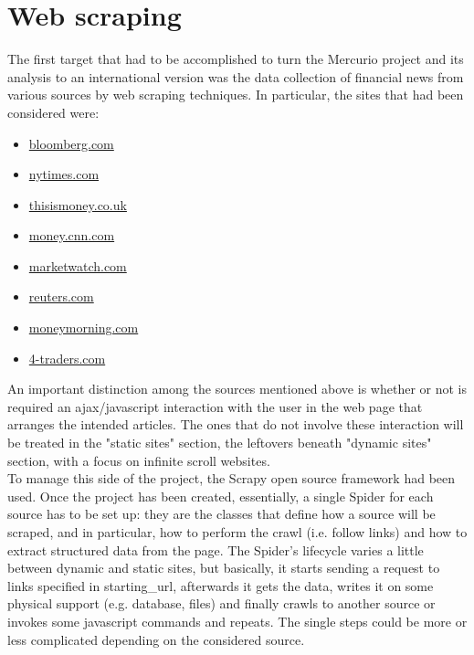 \section{Web scraping}
The first target that had to be accomplished to turn the Mercurio project and its analysis to an international version was the data collection of financial news from various sources by web scraping techniques. In particular, the sites that had been considered were: 
\begin{itemize}
\item \href{https://www.bloomberg.com}{bloomberg.com}
\item \href{https://www.nytimes.com}{nytimes.com}
\item \href{https://www.thisismoney.co.uk}{thisismoney.co.uk}
\item \href{http://money.cnn.com}{money.cnn.com}
\item \href{http://www.marketwatch.com}{marketwatch.com}
\item \href{http://www.reuters.com}{reuters.com}
\item \href{http://www.moneymorning.com}{moneymorning.com} 
\item \href{http://www.4-traders.com/}{4-traders.com}
\end{itemize}
An important distinction among the sources mentioned above is whether or not is required an ajax/javascript interaction with the user in the web page that arranges the intended articles. The ones that do not involve these interaction will be treated in the "static sites" section, the leftovers beneath "dynamic sites" section, with a focus on infinite scroll websites. \\ 
To manage this side of the project, the Scrapy open source framework \cite{scrapyframework} had been used. %
Once the project has been created, essentially, a single Spider \cite{scrapyspider} for each source has to be set up: they are the classes that define how a source will be scraped, and in particular, how to perform the crawl (i.e. follow links) and how to extract structured data from the page. The Spider's lifecycle varies a little between dynamic and static sites, but basically, it starts sending a request to links specified in starting\_url, afterwards it gets the data, writes it on some physical support (e.g. database, files) and finally crawls to another source or invokes some javascript commands and repeats. The single steps could be more or less complicated depending on the considered source. \\

